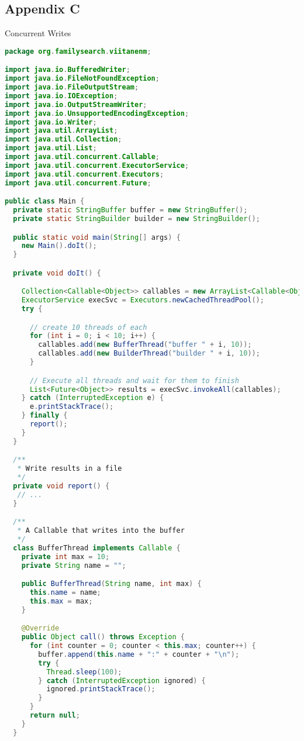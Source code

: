 \subsection*{Appendix C} \label{App:AppendixC}
Concurrent Writes
\begin{lstlisting}[language=Java]
package org.familysearch.viitanenm;

import java.io.BufferedWriter;
import java.io.FileNotFoundException;
import java.io.FileOutputStream;
import java.io.IOException;
import java.io.OutputStreamWriter;
import java.io.UnsupportedEncodingException;
import java.io.Writer;
import java.util.ArrayList;
import java.util.Collection;
import java.util.List;
import java.util.concurrent.Callable;
import java.util.concurrent.ExecutorService;
import java.util.concurrent.Executors;
import java.util.concurrent.Future;

public class Main {
  private static StringBuffer buffer = new StringBuffer();
  private static StringBuilder builder = new StringBuilder();

  public static void main(String[] args) {
    new Main().doIt();
  }

  private void doIt() {

    Collection<Callable<Object>> callables = new ArrayList<Callable<Object>>();
    ExecutorService execSvc = Executors.newCachedThreadPool();
    try {

      // create 10 threads of each
      for (int i = 0; i < 10; i++) {
        callables.add(new BufferThread("buffer " + i, 10));
        callables.add(new BuilderThread("builder " + i, 10));
      }

      // Execute all threads and wait for them to finish
      List<Future<Object>> results = execSvc.invokeAll(callables);
    } catch (InterruptedException e) {
      e.printStackTrace();
    } finally {
      report();
    }
  }

  /**
   * Write results in a file
   */
  private void report() {
   // ...
  }

  /**
   * A Callable that writes into the buffer
   */
  class BufferThread implements Callable {
    private int max = 10;
    private String name = "";

    public BufferThread(String name, int max) {
      this.name = name;
      this.max = max;
    }

    @Override
    public Object call() throws Exception {
      for (int counter = 0; counter < this.max; counter++) {
        buffer.append(this.name + ":" + counter + "\n");
        try {
          Thread.sleep(100);
        } catch (InterruptedException ignored) {
          ignored.printStackTrace();
        }
      }
      return null;
    }
  }
  

\end{lstlisting}
